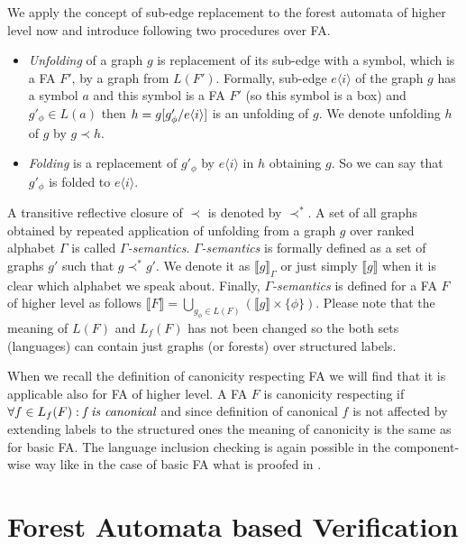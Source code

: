 We apply the concept of sub-edge replacement to the forest automata of higher level now
and introduce following two procedures over FA.
\begin{itemize}
	\item \emph{Unfolding} of a graph $g$ is replacement of its sub-edge with a symbol, which is
		a FA $F'$, by a graph from $L(F')$.
		Formally, sub-edge $e\langle i \rangle$ of the graph $g$ has a symbol $a$ and this symbol is a FA $F'$ (so this symbol is a box)
		and $g'_\phi \in L(a)$ then $h = g [g'_\phi/e\langle i \rangle]$ is an unfolding of $g$.
		We denote unfolding $h$ of $g$ by $g \prec h$.
	\item \emph{Folding} is a replacement of $g'_\phi$ by $e \langle i \rangle$ in $h$ obtaining $g$.
		So we can say that $g'_\phi$ is folded to $e \langle i \rangle$. 
\end{itemize}

A transitive reflective closure of $\prec$ is denoted by $\prec^*$.
A set of all graphs obtained by repeated application of unfolding from
a graph $g$ over ranked alphabet $\Gamma$ is called \emph{$\Gamma$-semantics}. 
\emph{$\Gamma$-semantics} is formally defined as a set of graphs $g'$ such that $g \prec^* g'$.
We denote it as $\llbracket g \rrbracket_\Gamma$ or just simply $\llbracket g \rrbracket$ when it is
clear which alphabet we speak about.
Finally, \emph{$\Gamma$-semantics} is defined for a FA $F$ of higher level as follows
$\llbracket F \rrbracket = \bigcup_{g_\phi \in L(F)} (\llbracket g \rrbracket \times \{\phi\})$.
Please note that the meaning of $L(F)$ and $L_f(F)$ has not been changed
so the both sets (languages) can contain just graphs (or forests) over structured labels.

When we recall the definition of canonicity respecting FA we will find that it is applicable also for FA of higher level.
A FA $F$ is canonicity respecting if $\forall f \in L_f(F): \emph{f is canonical}$ and since definition of canonical $f$
is not affected by extending labels to the structured ones the meaning of canonicity is the same as for basic FA.
The language inclusion checking is again possible in the component-wise way like in the case of basic FA what is
proofed in \cite{forester:techrep}.


\chapter{Forest Automata based Verification}
\label{ch:fav}

